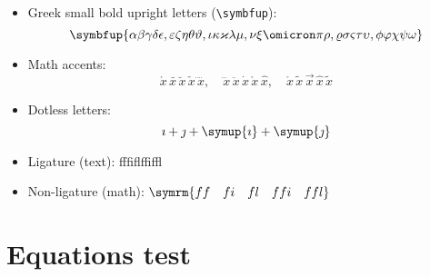 \documentclass{article}
\def\greekalphabets{
  \alpha      \beta       \gamma      \delta      \epsilon   ,
  \varepsilon \zeta       \eta        \theta      \vartheta  ,
  \iota       \kappa      \varkappa   \lambda     \mu        ,
  \nu         \xi         \omicron    \pi         \rho       ,
  \varrho     \sigma      \varsigma   \tau        \upsilon   ,
  \phi        \varphi     \chi        \psi        \omega
}
\def\ligaturetext{ff\quad fi\quad fl\quad ffi\quad ffl}
\begin{document}
\begin{itemize}
  \item Greek small bold upright letters (\verb|\symbfup|):
        \[ \symbfup{\greekalphabets} \]

  \item Math accents:
        \[
          \acute{x}    \, \bar{x}   \, \breve{x} \, \check{x}   \, \ddddot{x}    , \quad
          \dddot{x}    \, \ddot{x}  \, \dot{x}   \, \grave{x}   \, \hat{x}       , \quad
          \mathring{x} \, \tilde{x} \, \vec{x}   \, \widehat{x} \, \widetilde{x}
        \]

  \item Dotless letters:
        \[ \imath + \jmath + \symup{\imath} + \symup{\jmath} \]

  \item Ligature (text): {\firatext\ligaturetext}

  \item Non-ligature (math): $ \symrm{\ligaturetext} $
\end{itemize}

\section{Equations test}
\end{document}
